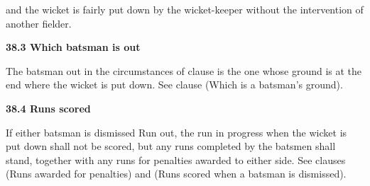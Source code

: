 \documentclass[12pt]{article}
\begin{document}
\vspace{\baselineskip}
\begin{adjustwidth}{1.12in}{0.0in}
{\fontsize{9pt}{10.8pt}\selectfont and the wicket is fairly put down by the wicket-keeper without the intervention of another fielder.\par}\par

\end{adjustwidth}


\vspace{\baselineskip}
{\fontsize{11pt}{13.2pt}\selectfont \textbf{38.3 \tabto{0.47in} Which batsman is out}\par}\par


\vspace{\baselineskip}
\begin{adjustwidth}{0.0in}{0.15in}
{\fontsize{9pt}{10.8pt}\selectfont The batsman out in the circumstances of clause is the one whose ground is at the end where the wicket is put down. See clause (Which is a batsman’s ground).\par}\par

\end{adjustwidth}


\vspace{\baselineskip}
{\fontsize{11pt}{13.2pt}\selectfont \textbf{38.4 \tabto{0.47in} Runs scored}\par}\par


\vspace{\baselineskip}
\begin{adjustwidth}{0.0in}{0.08in}
\begin{justify}
{\fontsize{9pt}{10.8pt}\selectfont If either batsman is dismissed Run out, the run in progress when the wicket is put down shall not be scored, but any runs completed by the batsmen shall stand, together with any runs for penalties awarded to either side. See clauses (Runs awarded for penalties) and (Runs scored when a batsman is dismissed).\par}
\end{justify}\par

\end{adjustwidth}


\vspace{\baselineskip}

\vspace{\baselineskip}
\end{document}

